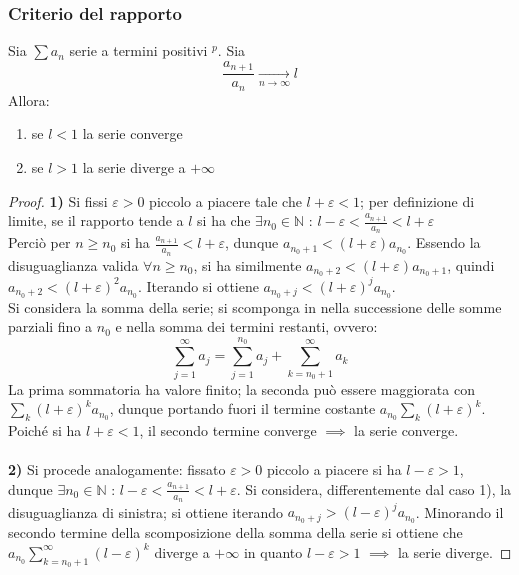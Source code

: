 \documentclass[10pt]{article}
\theoremstyle{plain}
\begin{document}
\subsubsection{Criterio del rapporto}
\begin{ther}
Sia $\sum a_n$ serie a termini positivi \hyperlink{posit}{$^p$}. Sia
\[\frac{a_{n+1}}{a_n} \xrightarrow[n \rightarrow \infty]{} l\]
Allora:
\begin{enumerate}
    \item se $l < 1$ la serie converge
    \item se $l > 1$ la serie diverge a $+ \infty$
\end{enumerate}
\end{ther}
\begin{proof}
\textbf{1)} Si fissi $\varepsilon > 0$ piccolo a piacere tale che $l + \varepsilon < 1$; per definizione di limite, se il rapporto tende a $l$ si ha che $\exists n_0 \in \mathbb{N}$ : $l - \varepsilon < \frac{a_{n + 1}}{a_n} < l + \varepsilon$
\\Perciò per $n \geq n_0$ si ha $\frac{a_{n + 1}}{a_n} < l + \varepsilon$, dunque $a_{n_0 +1} < (l + \varepsilon) a_{n_0}$. Essendo la disuguaglianza valida $\forall n \geq n_0$, si ha similmente $a_{n_0 + 2} < (l + \varepsilon) a_{n_0 +1}$, quindi $a_{n_0 + 2} < (l + \varepsilon)^2 a_{n_0}$. Iterando si ottiene $a_{n_0 + j} < (l + \varepsilon)^j a_{n_0}$.
\\Si considera la somma della serie; si scomponga in nella successione delle somme parziali fino a $n_0$ e nella somma dei termini restanti, ovvero:
\[\sum \limits_{j=1}^{\infty} a_j = \sum \limits_{j=1}^{n_0} a_j + \sum \limits_{k=n_0 + 1}^{\infty} a_k\]
La prima sommatoria ha valore finito; la seconda può essere maggiorata con $\sum_k (l + \varepsilon)^k a_{n_0}$, dunque portando fuori il termine costante $a_{n_0} \sum_k (l + \varepsilon)^k$. Poiché si ha $l + \varepsilon < 1$, il secondo termine converge $\implies$ la serie converge.
\\~\\\textbf{2)} Si procede analogamente: fissato $\varepsilon > 0$ piccolo a piacere si ha $l - \varepsilon > 1$, dunque $\exists n_0 \in \mathbb{N}$ : $l - \varepsilon < \frac{a_{n + 1}}{a_n} < l + \varepsilon$. Si considera, differentemente dal caso 1), la disuguaglianza di sinistra; si ottiene iterando $a_{n_0 + j} > (l - \varepsilon)^j a_{n_0}$. Minorando il secondo termine della scomposizione della somma della serie si ottiene che $a_{n_0} \sum \limits_{k=n_0 + 1}^{\infty} (l - \varepsilon)^k$ diverge a $+ \infty$ in quanto $l - \varepsilon > 1$ $\implies$ la serie diverge.
\end{proof}
\end{document}
